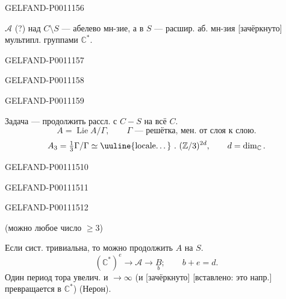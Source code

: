 \begin{GelfandAdjacentEvidence}{GELFAND-P001115}{6}

$\mathcal A$ (?) над $C\setminus S$ — абелево мн-зие,
а в $S$ — расшир. аб. мн-зия [зачёркнуто] мультипл. группами $\mathbb C^*$.
\end{GelfandAdjacentEvidence}
\begin{GelfandAdjacentEvidence}{GELFAND-P001115}{7}

\end{GelfandAdjacentEvidence}
\begin{GelfandAdjacentEvidence}{GELFAND-P001115}{8}

\end{GelfandAdjacentEvidence}
\begin{GelfandAdjacentEvidence}{GELFAND-P001115}{9}


Задача — продолжить рассл. с $C-S$ на всё $C$.
\[
A=\operatorname{Lie}A/\Gamma,\qquad
\Gamma\text{ — решётка, мен. от слоя к слою}.
\]
\[
A_3=\tfrac13\Gamma/\Gamma
\simeq \text{\uuline{locale\ldots}}\ .\ 
(\mathbb Z/3)^{2d},\qquad d=\dim_{\mathbb C}.
\]
\end{GelfandAdjacentEvidence}
\begin{GelfandAdjacentEvidence}{GELFAND-P001115}{10}

\end{GelfandAdjacentEvidence}
\begin{GelfandAdjacentEvidence}{GELFAND-P001115}{11}

\SourceFigure{GELFAND-P001115}{local-system-gloss}{
[под латинским словом] [локальная система}
\end{GelfandAdjacentEvidence}
\begin{GelfandAdjacentEvidence}{GELFAND-P001115}{12}


(можно любое число $\geq3$)

Если сист. тривиальна, то можно продолжить $A$ на $S$.
\[
(\mathbb C^*)^e\longrightarrow\mathcal A\longrightarrow
\underset{b}{B};\qquad b+e=d.
\]
Один период тора увелич. и $\to\infty$
(и [зачёркнуто] [вставлено: это напр.] превращается в $\mathbb C^*$)
(Нерон).
\end{GelfandAdjacentEvidence}
